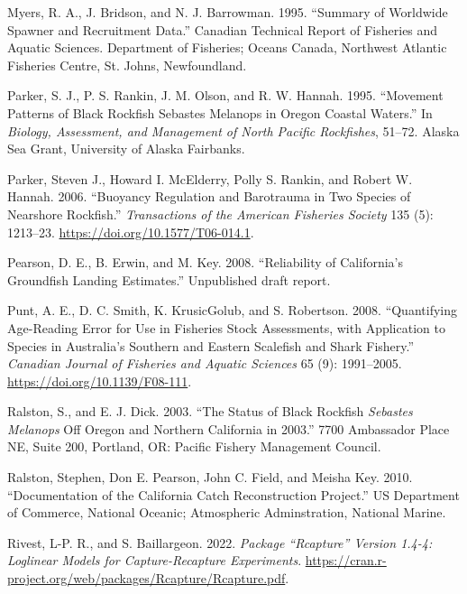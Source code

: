 \documentclass[11pt,
  english,
  letterpaper,
]{article}
\newlength{\cslhangindent}
\newenvironment{CSLReferences}[2] %
 {%
  \setlength{\parindent}{0pt}
  \ifodd #1 \everypar{\setlength{\hangindent}{\cslhangindent}}\ignorespaces\fi
  \ifnum #2 > 0
  \setlength{\parskip}{#2\baselineskip}
  \fi
 }%
 {}
\begin{document}
\begin{CSLReferences}{1}{0}
\leavevmode{}%
Myers, R. A., J. Bridson, and N. J. Barrowman. 1995. {``Summary of Worldwide Spawner and Recruitment Data.''} Canadian Technical Report of Fisheries and Aquatic Sciences. Department of Fisheries; Oceans Canada, Northwest Atlantic Fisheries Centre, St. Johns, Newfoundland.

\leavevmode{}%
Parker, S. J., P. S. Rankin, J. M. Olson, and R. W. Hannah. 1995. {``Movement Patterns of Black Rockfish Sebastes Melanops in Oregon Coastal Waters.''} In \emph{Biology, Assessment, and Management of North Pacific Rockfishes}, 51--72. Alaska Sea Grant, University of Alaska Fairbanks.

\leavevmode{}%
Parker, Steven J., Howard I. McElderry, Polly S. Rankin, and Robert W. Hannah. 2006. {``Buoyancy Regulation and Barotrauma in Two Species of Nearshore Rockfish.''} \emph{Transactions of the American Fisheries Society} 135 (5): 1213--23. \url{https://doi.org/10.1577/T06-014.1}.

\leavevmode{}%
Pearson, D. E., B. Erwin, and M. Key. 2008. {``Reliability of California's Groundfish Landing Estimates.''} Unpublished draft report.

\leavevmode{}%
Punt, A. E., D. C. Smith, K. KrusicGolub, and S. Robertson. 2008. {``Quantifying Age-Reading Error for Use in Fisheries Stock Assessments, with Application to Species in {A}ustralia's Southern and Eastern Scalefish and Shark Fishery.''} \emph{Canadian Journal of Fisheries and Aquatic Sciences} 65 (9): 1991--2005. \url{https://doi.org/10.1139/F08-111}.

\leavevmode{}%
Ralston, S., and E. J. Dick. 2003. {``The Status of Black Rockfish \emph{{Sebastes} Melanops} Off Oregon and Northern California in 2003.''} 7700 Ambassador Place NE, Suite 200, Portland, OR: Pacific Fishery Management Council.

\leavevmode{}%
Ralston, Stephen, Don E. Pearson, John C. Field, and Meisha Key. 2010. {``Documentation of the {California} Catch Reconstruction Project.''} US Department of Commerce, National Oceanic; Atmospheric Adminstration, National Marine.

\leavevmode{}%
Rivest, L-P. R., and S. Baillargeon. 2022. \emph{Package {``Rcapture''} Version 1.4-4: Loglinear Models for Capture-Recapture Experiments}. \url{https://cran.r-project.org/web/packages/Rcapture/Rcapture.pdf}.


\end{CSLReferences}
\end{document}
